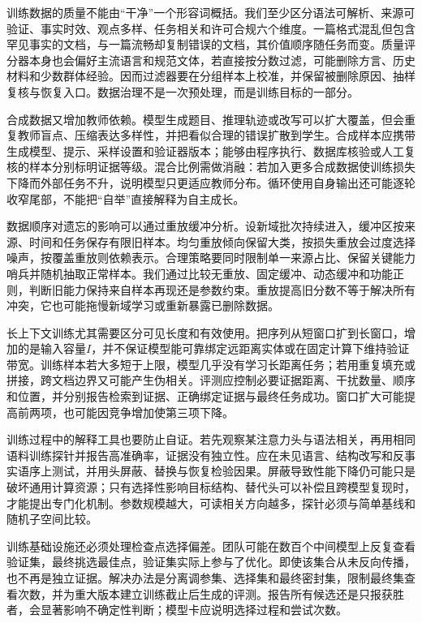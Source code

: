 训练数据的质量不能由“干净”一个形容词概括。我们至少区分语法可解析、来源可验证、事实时效、观点多样、任务相关和许可合规六个维度。一篇格式混乱但包含罕见事实的文档，与一篇流畅却复制错误的文档，其价值顺序随任务而变。质量评分器本身也会偏好主流语言和规范文体，若直接按分数过滤，可能删除方言、历史材料和少数群体经验。因而过滤器要在分组样本上校准，并保留被删除原因、抽样复核与恢复入口。数据治理不是一次预处理，而是训练目标的一部分。

合成数据又增加教师依赖。模型生成题目、推理轨迹或改写可以扩大覆盖，但会重复教师盲点、压缩表达多样性，并把看似合理的错误扩散到学生。合成样本应携带生成模型、提示、采样设置和验证器版本；能够由程序执行、数据库核验或人工复核的样本分别标明证据等级。混合比例需做消融：若加入更多合成数据使训练损失下降而外部任务不升，说明模型只更适应教师分布。循环使用自身输出还可能逐轮收窄尾部，不能把“自举”直接解释为自主成长。

数据顺序对遗忘的影响可以通过重放缓冲分析。设新域批次持续进入，缓冲区按来源、时间和任务保存有限旧样本。均匀重放倾向保留大类，按损失重放会过度选择噪声，按覆盖重放则依赖表示。合理策略要同时限制单一来源占比、保留关键能力哨兵并随机抽取正常样本。我们通过比较无重放、固定缓冲、动态缓冲和功能正则，判断旧能力保持来自样本再现还是参数约束。重放提高旧分数不等于解决所有冲突，它也可能拖慢新域学习或重新暴露已删除数据。

长上下文训练尤其需要区分可见长度和有效使用。把序列从短窗口扩到长窗口，增加的是输入容量$I$，并不保证模型能可靠绑定远距离实体或在固定计算下维持验证带宽。训练样本若大多短于上限，模型几乎没有学习长距离任务；若用重复填充或拼接，跨文档边界又可能产生伪相关。评测应控制必要证据距离、干扰数量、顺序和位置，并分别报告检索到证据、正确绑定证据与最终任务成功。窗口扩大可能提高前两项，也可能因竞争增加使第三项下降。

训练过程中的解释工具也要防止自证。若先观察某注意力头与语法相关，再用相同语料训练探针并报告高准确率，证据没有独立性。应在未见语言、结构改写和反事实语序上测试，并用头屏蔽、替换与恢复检验因果。屏蔽导致性能下降仍可能只是破坏通用计算资源；只有选择性影响目标结构、替代头可以补偿且跨模型复现时，才能提出专门化机制。参数规模越大，可读相关方向越多，探针必须与简单基线和随机子空间比较。

训练基础设施还必须处理检查点选择偏差。团队可能在数百个中间模型上反复查看验证集，最终挑选最佳点，验证集实际上参与了优化。即使该集合从未反向传播，也不再是独立证据。解决办法是分离调参集、选择集和最终密封集，限制最终集查看次数，并为重大版本建立训练截止后生成的评测。报告所有候选还是只报获胜者，会显著影响不确定性判断；模型卡应说明选择过程和尝试次数。

